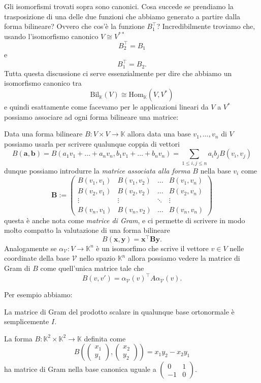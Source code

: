 \documentclass[11pt]{scrartcl}
\newcommand{\KK}{\mathbb{K}}
\begin{document}
	Gli isomorfismi trovati sopra sono canonici. Cosa succede se prendiamo la trasposizione di una delle due funzioni che abbiamo generato a partire dalla forma bilineare? Ovvero che cos'è la funzione $B_1^\intercal$? Incredibilmente troviamo che, usando l'isomorfismo canonico $V\cong V^{**}$ 
	$$B_2^\intercal=B_1$$
	e
	$$B_1^\intercal=B_2.$$
	Tutta questa discussione ci serve essenzialmente per dire che abbiamo un isomorfismo canonico tra 
	$$\text{Bil}_\KK(V)\cong \text{Hom}_\KK(V,V^*)$$
	e quindi esattamente come facevamo per le applicazioni lineari da $V$ a $V^*$ possiamo associare ad ogni forma bilineare una matrice:
	\begin{definition}
		Data una forma bilineare $B:V\times V \to \KK$ allora data una base $v_1,\dots,v_n$ di $V$ possiamo usarla per scrivere qualunque coppia di vettori
		$$B(\mathbf{a},\mathbf{b})=B\left(a_1v_1+\dots+a_nv_n,b_1v_1+\dots+b_nv_n\right)=\sum_{1\le i,j\le n}a_ib_jB(v_i,v_j)$$
		dunque possiamo introdurre la \textit{matrice associata alla forma $B$} nella base $v_i$ come 
		$$\mathbf{B}:=
		\begin{pmatrix}
			B(v_1,v_1) & B(v_1,v_2) & \dots & B(v_1,v_n) \\
			B(v_2,v_1) & B(v_2,v_2) & \dots & B(v_2,v_n) \\
			\vdots & \vdots & \ddots & \vdots \\
			B(v_n,v_1) & B(v_n,v_2) & \dots & B(v_n,v_n)
		\end{pmatrix}$$
		questa è anche nota come \textit{matrice di Gram}, e ci permette di scrivere in modo molto compatto la valutazione di una forma bilineare
		$$B(\mathbf{x},\mathbf{y})=\mathbf{x}^\intercal \mathbf{B}\mathbf{y}.$$
		Analogamente se $\alpha_\mathcal{V}:V\to\KK^n$ è un isomorfimo che scrive il vettore $v\in V$ nelle coordinate della base $\mathcal{V}$ nello spazio $\KK^n$ allora possiamo vedere la matrice di Gram di $B$ come quell'unica matrice tale che
		$$B(v,v')=\alpha_\mathcal{V}(v)^\intercal A \alpha_\mathcal{V}(v).$$
	\end{definition}
	Per esempio abbiamo:
	\begin{example}
		La matrice di Gram del prodotto scalare in qualunque base ortonormale è semplicemente $I$.
	\end{example}
	\begin{example}
		La forma $B:\KK^2\times \KK^2\to \KK$ 
		definita come
		$$B\left(
		\begin{pmatrix}
			x_1 \\
			y_1
		\end{pmatrix},
		\begin{pmatrix}
			x_2 \\
			y_2
		\end{pmatrix}
		\right)=x_1y_2-x_2y_1$$
		ha matrice di Gram nella base canonica uguale a 
		$\begin{pmatrix}
			0 & 1 \\
			-1 & 0
		\end{pmatrix}.$
	\end{example}
\end{document}
